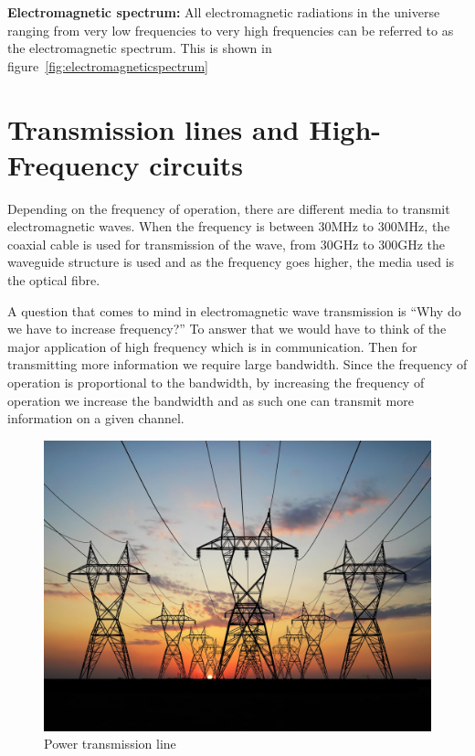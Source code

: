 \textbf{Electromagnetic spectrum:} All electromagnetic radiations in the universe ranging from very low frequencies to very high frequencies can be referred to as the electromagnetic spectrum. This is shown in figure~\ref{fig:electromagneticspectrum}
\section{Transmission lines and High-Frequency circuits}

Depending on the frequency of operation, there are different media to transmit electromagnetic waves. When the frequency is between 30MHz to 300MHz, the coaxial cable is used for transmission of the wave, from 30GHz to 300GHz the waveguide structure is used and as the frequency goes higher, the media used is the optical fibre.

A question that comes to mind in electromagnetic wave transmission is \textquotedblleft Why do we have to increase frequency?\textquotedblright \hspace{0.03in} To answer that we would have to think of the major application of high frequency which is in communication. Then for transmitting more information we require large bandwidth. Since the frequency of operation is proportional to the bandwidth, by increasing the frequency of operation we increase the bandwidth and as such one can transmit more information on a given channel.
\begin{figure}[h]
\centering
\includegraphics[scale=0.1]{./graphics/transmission2}
\caption{Power transmission line}
\end{figure}

